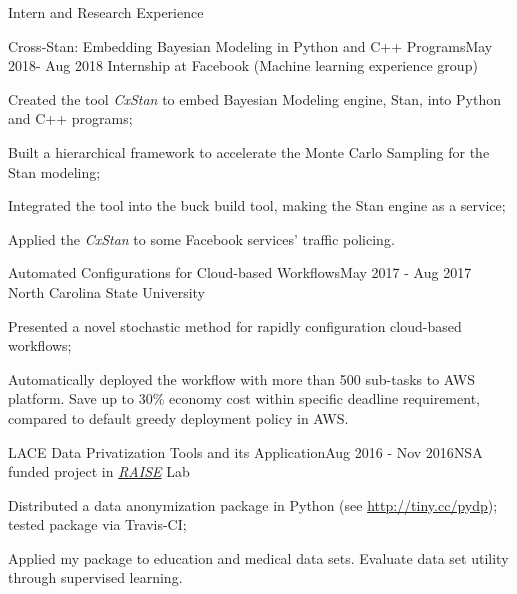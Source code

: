 \documentclass{resume} %
\begin{document}
\begin{rSection}{Intern and Research Experience}
\begin{rSubsection}{Cross-Stan: Embedding Bayesian Modeling in Python and C++ Programs}{May 2018- Aug 2018}
{Internship at Facebook (Machine learning experience group)}{}
\item Created the tool {\it CxStan} to embed Bayesian Modeling engine, Stan, into Python and C++ programs;
\item Built a hierarchical framework to accelerate the  Monte Carlo Sampling for the Stan modeling;
\item Integrated the tool into the buck build tool, making the Stan engine as a service;
\item Applied the {\it CxStan} to some Facebook services' traffic policing.
\end{rSubsection}

\begin{rSubsection}{Automated Configurations for Cloud-based Workflows}{May 2017 - Aug 2017}
{North Carolina State University}{}
\item Presented a novel stochastic method for rapidly configuration cloud-based workflows;
\item Automatically deployed the workflow with more than 500 sub-tasks to AWS platform. Save up to 30\% economy cost within specific deadline requirement, compared to default greedy deployment policy in AWS.
\end{rSubsection}

\begin{rSubsection}{LACE Data Privatization Tools and its Application}{Aug 2016 - Nov 2016}{NSA funded project in \href{http://ai4se.net/index}{\textit{RAISE}} Lab}{}

\item Distributed a data anonymization  package in Python (see \url{http://tiny.cc/pydp}); tested package via Travis-CI;
\item Applied my package to education and medical data sets. Evaluate data set utility through supervised learning.
\end{rSubsection}



\end{rSection}
\end{document}

